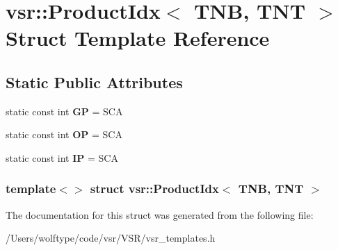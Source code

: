 \hypertarget{structvsr_1_1_product_idx_3_01_t_n_b_00_01_t_n_t_01_4}{\section{vsr\-:\-:Product\-Idx$<$ T\-N\-B, T\-N\-T $>$ Struct Template Reference}
\label{structvsr_1_1_product_idx_3_01_t_n_b_00_01_t_n_t_01_4}
}
\subsection*{Static Public Attributes}
\begin{DoxyCompactItemize}
\item 
\hypertarget{structvsr_1_1_product_idx_3_01_t_n_b_00_01_t_n_t_01_4_a7183a84f4fcfa7542a53a1a95ab342c9}{static const int {\bfseries G\-P} = S\-C\-A}\label{structvsr_1_1_product_idx_3_01_t_n_b_00_01_t_n_t_01_4_a7183a84f4fcfa7542a53a1a95ab342c9}

\item 
\hypertarget{structvsr_1_1_product_idx_3_01_t_n_b_00_01_t_n_t_01_4_a728b6b710ebc7ece601084a593ad6a1a}{static const int {\bfseries O\-P} = S\-C\-A}\label{structvsr_1_1_product_idx_3_01_t_n_b_00_01_t_n_t_01_4_a728b6b710ebc7ece601084a593ad6a1a}

\item 
\hypertarget{structvsr_1_1_product_idx_3_01_t_n_b_00_01_t_n_t_01_4_a377309397ad18c0b3491ef6c79bda37a}{static const int {\bfseries I\-P} = S\-C\-A}\label{structvsr_1_1_product_idx_3_01_t_n_b_00_01_t_n_t_01_4_a377309397ad18c0b3491ef6c79bda37a}

\end{DoxyCompactItemize}
\subsubsection*{template$<$$>$ struct vsr\-::\-Product\-Idx$<$ T\-N\-B, T\-N\-T $>$}



The documentation for this struct was generated from the following file\-:\begin{DoxyCompactItemize}
\item 
/\-Users/wolftype/code/vsr/\-V\-S\-R/vsr\-\_\-templates.\-h\end{DoxyCompactItemize}

